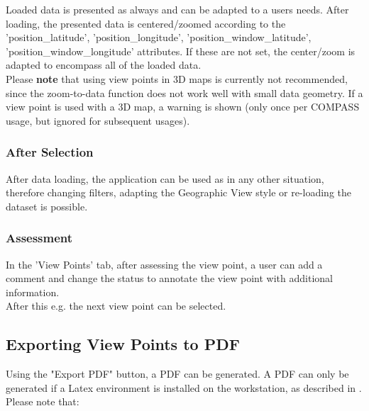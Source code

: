 Loaded data is presented as always and can be adapted to a users needs. After loading, the presented data is centered/zoomed according to the 'position\_latitude', 'position\_longitude', 'position\_window\_latitude', 'position\_window\_longitude' attributes. If these are not set, the center/zoom is adapted to encompass all of the loaded data. \\

Please \textbf{note} that using view points in 3D maps is currently not recommended, since the zoom-to-data function does not work well with small data geometry. If a view point is used with a 3D map, a warning is shown (only once per COMPASS usage, but ignored for subsequent usages).

\subsubsection{After Selection}

After data loading, the application can be used as in any other situation, therefore changing filters, adapting the Geographic View style or re-loading the dataset is possible.

\subsubsection{Assessment}

In the 'View Points' tab, after assessing the view point, a user can add a comment and change the status to annotate the view point with additional information. \\

After this e.g. the next view point can be selected.

\subsection{Exporting View Points to PDF}
\label{sec:view_points_export_pdf} 

Using the "Export PDF" button, a PDF can be generated. A PDF can only be generated if a Latex environment is installed on the workstation, as described in . \\

Please note that:

